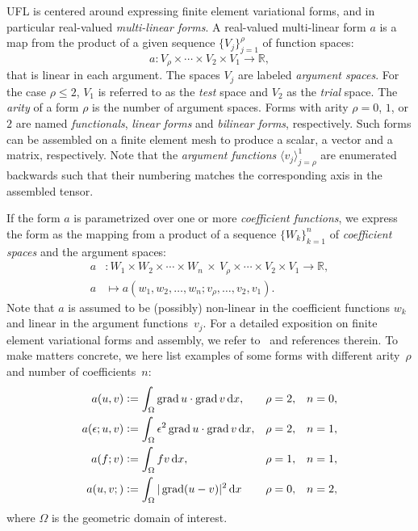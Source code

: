 \documentclass[prodmode,acmtoms]{acmsmall}
\DeclareMathOperator{\Grad}{grad}
\newcommand{\R}{\mathbb{R}}
\newcommand{\dx}{\dif{}x}
\begin{document}
UFL is centered around expressing finite element variational forms,
and in particular real-valued \emph{multi-linear forms}. A real-valued
multi-linear form $a$ is a map from the product of a given sequence
$\{V_j\}_{j=1}^{\rho}$ of function spaces:
\begin{equation}
  a : V_{\rho} \times \cdots \times V_2 \times V_1 \rightarrow \R,
\end{equation}
that is linear in each argument. The spaces $V_j$ are labeled
\emph{argument spaces}. For the case $\rho \le 2$, $V_1$ is referred
to as the \emph{test} space and $V_2$ as the \emph{trial} space.  The
\emph{arity} of a form $\rho$ is the number of argument spaces. Forms
with arity $\rho= 0$, $1$, or $2$ are named \emph{functionals},
\emph{linear forms} and \emph{bilinear forms}, respectively. Such
forms can be assembled on a finite element mesh to produce a scalar, a
vector and a matrix, respectively.  Note that the \emph{argument
  functions} $\langle v_j \rangle_{j=\rho}^1$ are enumerated backwards
such that their numbering matches the corresponding axis in the
assembled tensor.

If the form $a$ is parametrized over one or more \emph{coefficient
  functions}, we express the form as the mapping from a product of a
sequence $\{W_k\}_{k=1}^{n}$ of \emph{coefficient spaces} and the
argument spaces:
\begin{equation}
  \label{eq:generalform}
  \begin{split}
    a &: W_1 \times W_2 \times \cdots \times W_n \, \times \,
         V_{\rho} \times \cdots \times V_2 \times V_1 \rightarrow \R, \\
    a &\mapsto a(w_1, w_2, \ldots, w_n; v_{\rho}, \ldots, v_2, v_1).
  \end{split}
\end{equation}
Note that $a$ is assumed to be (possibly) non-linear in the
coefficient functions $w_k$ and linear in the argument
functions~$v_j$. For a detailed exposition on finite element
variational forms and assembly, we refer to~\citep{KirbyLogg2012} and
references therein. To make matters concrete, we here list examples of
some forms with different arity~$\rho$ and number of coefficients~$n$:
\begin{align}
  a(u, v) &:= \int_{\Omega} \Grad u \cdot \Grad v \dx,
    & \rho = 2, \quad& n = 0, \\
  a(\epsilon; u, v) &:= \int_{\Omega} \epsilon^2 \Grad u \cdot \Grad v \dx,
    & \rho = 2, \quad& n = 1, \\
  a(f; v) &:= \int_{\Omega} f v \dx,
    & \rho = 1, \quad& n = 1, \\
  a(u, v;) &:= \int_{\Omega} |\Grad (u - v)|^2 \dx
    & \rho = 0, \quad& n = 2,
\end{align}
where $\Omega$ is the geometric domain of interest.
\end{document}
